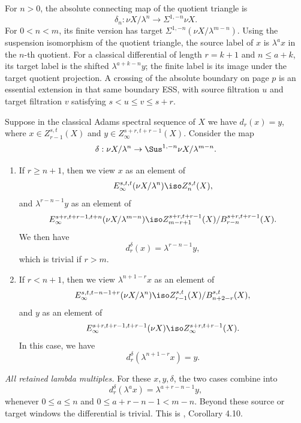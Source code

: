 For $n>0$, the absolute connecting map of the quotient triangle is
\[\delta_n:\nu X/\lambda^n\longrightarrow\Sigma^{1,-n}\nu X.\]
For $0<n<m$, its finite version has target $\Sigma^{1,-n}(\nu X/\lambda^{m-n})$. Using the suspension isomorphism of the quotient triangle, the source label of $x$ is $\lambda^a x$ in the $n$-th quotient. For a classical differential of length $r=k+1$ and $n\leq a+k$, its target label is the shifted $\lambda^{a+k-n}y$; the finite label is its image under the target quotient projection. A crossing of the absolute boundary on page $p$ is an essential extension in that same boundary ESS, with source filtration $u$ and target filtration $v$ satisfying $s<u\leq v\leq s+r$.

\begin{proposition}
\label{paper:4.6}
\label{prop:6de7d130}
\label{paper:4.10}
\label{cor:2a636737}

Suppose in the classical Adams spectral sequence of $X$ we have $d_r(x)=y$, where $x\in Z_{r-1}^{s,t}(X)$ and $y\in Z_\infty^{s+r,t+r-1}(X)$. Consider the map
    $$\delta:\nu X/\lambda^n\to \Sus^{1,-n}\nu X/\lambda^{m-n}.$$
    \begin{enumerate}
        \item If $r\ge n+1$, then we view $x$ as an element of
        $$E_\infty^{s,t,t}(\nu X/\lambda^n)\iso Z_n^{s,t}(X),$$
        and $\lambda^{r-n-1} y$ as an element of
        $$E_\infty^{s+r,t+r-1, t+n}(\nu X/\lambda^{m-n})\iso Z_{m-r+1}^{s+r,t+r-1}(X)/B_{r-n}^{s+r,t+r-1}(X).$$
        We then have
        $$d^{\delta}_r(x)=\lambda^{r-n-1}y,$$
        which is trivial if $r>m$.
        \item If $r<n+1$, then we view $\lambda^{n+1-r}x$ as an element of
        $$E_\infty^{s,t,t-n-1+r}(\nu X/\lambda^n)\iso Z^{s,t}_{r-1}(X)/B^{s,t}_{n+2-r}(X),$$
        and $y$ as an element of
        $$E_\infty^{s+r,t+r-1, t+r-1}(\nu X)\iso Z_\infty^{s+r,t+r-1}(X).$$
        In this case, we have
        $$d^{\delta}_r(\lambda^{n+1-r}x)=y.$$
    \end{enumerate}

\textit{All retained lambda multiples.}
For these $x,y,\delta$, the two cases combine into
\begin{equation}\label{eq:841425e9}
 d_r^\delta(\lambda^ax)=\lambda^{a+r-n-1}y,
\end{equation}
whenever $0\le a\le n$ and $0\le a+r-n-1<m-n$.
Beyond these source or target windows the differential is trivial.
This is \cite{LWX126}, Corollary 4.10.
\end{proposition}

